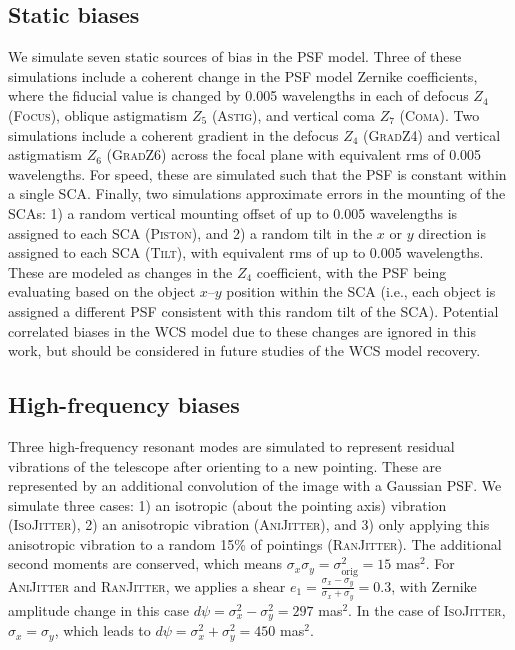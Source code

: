 \documentclass[aps,prd, amsmath,amssymb,superscriptaddress,showkeys,nofootinbib,reprint,preprintnumbers]{revtex4-1}
\begin{document}
\subsection{Static biases}\label{sec:static}

We simulate seven static sources of bias in the PSF model. 
Three of these simulations include a coherent change in the PSF model Zernike coefficients, where the fiducial value is changed by 0.005 wavelengths in each of defocus $Z_4$ (\textsc{Focus}), oblique astigmatism $Z_5$ (\textsc{Astig}), and vertical coma $Z_7$ (\textsc{Coma}). 
Two simulations include a coherent gradient in the defocus $Z_4$ (\textsc{GradZ4}) and vertical astigmatism $Z_6$ (\textsc{GradZ6}) across the focal plane with equivalent rms of 0.005 wavelengths. 
For speed, these are simulated such that the PSF is constant within a single SCA. Finally, two simulations approximate errors in the mounting of the SCAs: 1) a random vertical mounting offset of up to 0.005 wavelengths is assigned to each SCA (\textsc{Piston}), and 2) a random tilt in the $x$ or $y$ direction is assigned to each SCA  (\textsc{Tilt}), with equivalent rms of up to 0.005 wavelengths. 
These are modeled as changes in the $Z_4$ coefficient, with the PSF being evaluating based on the object $x$--$y$ position within the SCA (i.e., each object is assigned a different PSF consistent with this random tilt of the SCA). 
Potential correlated biases in the WCS model due to these changes are ignored in this work, but should be considered in future studies of the WCS model recovery.

\subsection{High-frequency biases}\label{sec:low}

Three high-frequency resonant modes are simulated to represent residual vibrations of the telescope after orienting to a new pointing. 
These are represented by an additional convolution of the image with a Gaussian PSF. We simulate three cases: 1) an isotropic (about the pointing axis) vibration  (\textsc{IsoJitter}), 2) an anisotropic vibration (\textsc{AniJitter}), and 3) only applying this anisotropic vibration to a random 15\% of pointings (\textsc{RanJitter}). 
The additional second moments are conserved, which means $\sigma_x\sigma_y=\sigma_{\mathrm{orig}}^2=15$ mas$^2$. 
For \textsc{AniJitter} and \textsc{RanJitter}, we applies a shear $e_1=\frac{\sigma_x-\sigma_y}{\sigma_x+\sigma_y}=0.3$,  with Zernike amplitude change in this case  $d\psi=\sigma_x^2-\sigma_y^2=297$ mas$^2$. 
In the case of \textsc{IsoJitter}, $\sigma_x=\sigma_y$, which leads to $d\psi=\sigma_x^2+\sigma_y^2=450$ mas$^2$.
\end{document}
